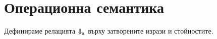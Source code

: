 \section{Операционна семантика}

Дефинираме релацията $\Downarrow_{\vv{a}}$ върху затворените изрази и стойностите.

\begin{prooftree}
\end{prooftree}

\begin{prooftree}
\end{prooftree}

\begin{prooftree}
\end{prooftree}


\begin{prooftree}
\end{prooftree}

\begin{prooftree}
\end{prooftree}

\begin{prooftree}
\end{prooftree}

\begin{prooftree}
\end{prooftree}

